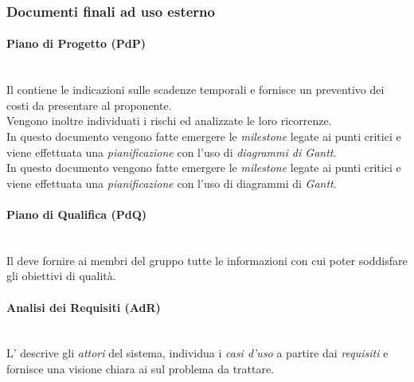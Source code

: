 	\subsubsection{Documenti finali ad uso esterno}
	\paragraph{Piano di Progetto (PdP)}
	~\\Il \PdP{} contiene le indicazioni sulle scadenze temporali e fornisce un preventivo dei costi da presentare al proponente. 
	~\\Vengono inoltre individuati i rischi ed analizzate le loro ricorrenze.
	~\\In questo documento vengono fatte emergere le \emph{milestone} legate ai punti critici e viene effettuata una \emph{pianificazione} con l'uso di \emph{diagrammi di Gantt}.
	~\\In questo documento vengono fatte emergere le \emph{milestone} legate ai punti critici e viene effettuata una \emph{pianificazione} con l'uso di diagrammi di \emph{Gantt}.
	\paragraph{Piano di Qualifica (PdQ)} 
	~\\Il \PdQ{} deve fornire ai membri del gruppo tutte le informazioni con cui poter soddisfare gli obiettivi di qualità.
	\paragraph{Analisi dei Requisiti (AdR)}
	~\\L'\AdR{} descrive gli \emph{attori} del sistema, individua i \emph{casi d'uso} a partire dai \emph{requisiti} e fornisce una visione chiara ai \progs{} sul problema da trattare.
	
	\begin{comment}
	\paragraph{Specifica Tecnica (ST)}
	~\\La \ST{} si occupa di dare una descrizione ad alto livello del prodotto, descrivendo pregi e difetti delle sue tecnologie. \textcolor{red}{Da ampliare quando avremo fatto il documento}
	\paragraph{Definizione di Prodotto (DdP)}
	~\\La \DdP{} descrive i dettagli implementativi del prodotto, andando a definire anche le funzioni delle componenti terminali del sistema tramite diagrammi \emph{UML}.
	\end{comment}
	
